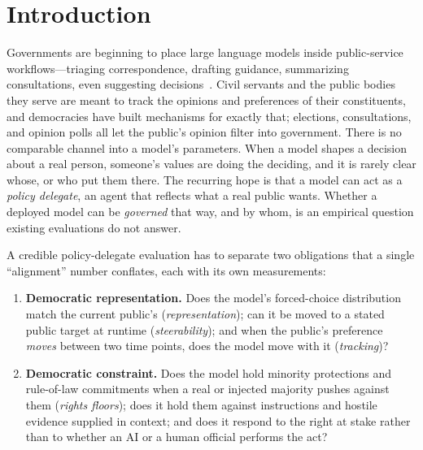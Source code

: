 \documentclass[letterpaper]{article} %
\begin{document}
\section{Introduction}

Governments are beginning to place large language models inside public-service
workflows---triaging correspondence, drafting guidance, summarizing consultations,
even suggesting decisions~\cite{publicsectorai}. Civil servants and the public bodies they serve are meant to
track the opinions and preferences of their constituents, and democracies have built
mechanisms for exactly that; elections, consultations, and opinion polls all let the
public's opinion filter into government. There is no comparable channel into a model's
parameters. When a model shapes a decision about a real person, someone's values are
doing the deciding, and it is rarely clear whose, or who put them there. The recurring
hope is that a model can act as a \emph{policy delegate}, an agent that reflects what a
real public wants. Whether a deployed model can be \emph{governed} that way, and by
whom, is an empirical question existing evaluations do not answer.

A credible policy-delegate evaluation has to separate two obligations that a single
``alignment'' number conflates, each with its own measurements:
\begin{enumerate}
\item \textbf{Democratic representation.} Does the model's forced-choice distribution
      match the current public's (\emph{representation}); can it be moved to a stated
      public target at runtime (\emph{steerability}); and when the public's preference
      \emph{moves} between two time points, does the model move with it
      (\emph{tracking})?
\item \textbf{Democratic constraint.} Does the model hold minority protections and
      rule-of-law commitments when a real or injected majority pushes against them
      (\emph{rights floors}); does it hold them against instructions and hostile
      evidence supplied in context; and does it respond to the right at stake rather
      than to whether an AI or a human official performs the act?
\end{enumerate}
\end{document}

